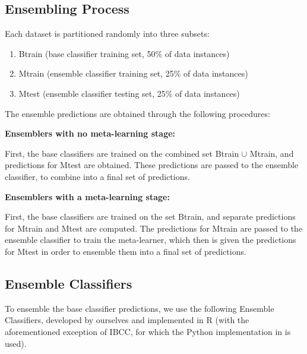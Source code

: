 \documentclass{bioinfo}
\begin{document}
\begin{methods}
\subsection{Ensembling Process}
\label{ensemblingprocess}

Each dataset is partitioned randomly into three subsets:
\begin{enumerate}
\item Btrain (base classifier training set, 50\% of data instances)
\item Mtrain (ensemble classifier training set, 25\% of data instances)
\item Mtest (ensemble classifier testing set, 25\% of data instances)
\end{enumerate}

\noindent
The ensemble predictions are obtained through the following procedures:

\vspace{1cm}
\noindent
\textbf{Ensemblers with no meta-learning stage:}

First, the base classifiers are trained on the combined set Btrain $\cup$ Mtrain, and predictions for Mtest are obtained. These predictions are passed to the ensemble classifier, to combine into a final set of predictions.

\noindent
\textbf{Ensemblers with a meta-learning stage:}

First, the base classifiers are trained on the set Btrain, and separate predictions for Mtrain and Mtest are computed. The predictions for Mtrain are passed to the ensemble classifier to train the meta-learner, which then is given the predictions for Mtest in order to ensemble them into a final set of predictions.

\subsection{Ensemble Classifiers}

To ensemble the base classifier predictions, we use the following Ensemble Classifiers, developed by ourselves and implemented in R (with the aforementioned exception of IBCC, for which the Python implementation in \cite{Simpson13} is used).


\end{methods}
\end{document}
